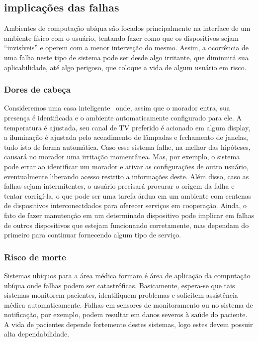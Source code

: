
\subsection{implicações das falhas} %
\label{sub:implicacoes_das_falhas}

Ambientes de computação ubíqua são focados principalmente na interface de um ambiente físico com o usuário, tentando fazer como que os dispositivos sejam ``invisíveis'' e operem com a menor interveção do mesmo. Assim, a ocorrência de uma falha neste tipo de sistema pode ser desde algo irritante, que diminuirá sua aplicabilidade, até algo perigoso, que coloque a vida de algum usuário em risco.

\subsubsection*{Dores de cabeça}

Consideremos uma casa inteligente~\cite{Kidd99} onde, assim que o morador entra, sua presença é identificada e o ambiente automaticamente configurado para ele. A temperatura é ajustada, seu canal de TV preferido é acionado em algum display, a iluminação é ajustada pelo acendimento de lâmpadas e fechamento de janelas, tudo isto de forma automática. Caso esse sistema falhe, na melhor das hipóteses, causará no morador uma irritação momentânea. Mas, por exemplo, o sistema pode errar ao identificar um morador e ativar as configurações de outro usuário, eventualmente liberando acesso restrito a informações deste. Além disso, caso as falhas sejam intermitentes, o usuário precisará procurar o origem da falha e tentar corrigí-la, o que pode ser uma tarefa árdua em um ambiente com centenas de dispositivos interconectdados para oferecer serviços em cooperação. Ainda, o fato de fazer manutenção em um determinado dispositivo pode implicar em falhas de outros dispositivos que estejam funcionando corretamente, mas dependam do primeiro para continuar fornecendo algum tipo de serviço.

\subsubsection*{Risco de morte}

Sistemas ubíquos para a área médica formam é área de aplicação da computação ubíqua onde falhas podem ser catastróficas. Basicamente, espera-se que tais sistemas monitorem pacientes, identifiquem problemas e solicitem assistência médica automaticamente. Falhas em sensores de monitoramento ou no sistema de notificação, por exemplo, podem resultar em danos severos à saúde do paciente. A vida de pacientes depende fortemente destes sistemas, logo estes devem possuir alta dependabilidade.

